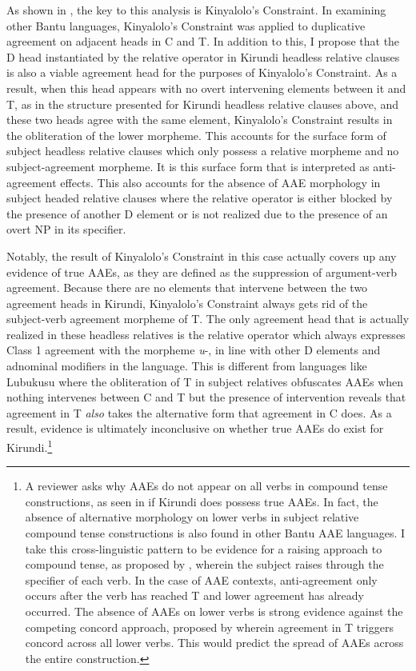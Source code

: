 \documentclass[output=paper,colorlinks,citecolor=brown
]{langscibook}
\begin{document}
As shown in , the key to this analysis is Kinyalolo's Constraint. In examining other Bantu languages, Kinyalolo's Constraint was applied to duplicative agreement on adjacent heads in C and T. In addition to this, I propose that the D head instantiated by the relative operator in Kirundi headless relative clauses is also a viable agreement head for the purposes of Kinyalolo's Constraint. As a result, when this head appears with no overt intervening elements between it and T, as in the structure presented for Kirundi headless relative clauses above, and these two heads agree with the same element, Kinyalolo's Constraint results in the obliteration of the lower morpheme. This accounts for the surface form of subject headless relative clauses which only possess a relative morpheme and no subject-agreement morpheme. It is this surface form that is interpreted as anti-agreement effects. This also accounts for the absence of AAE morphology in subject headed relative clauses where the relative operator is either blocked by the presence of another D element or is not realized due to the presence of an overt NP in its specifier.

Notably, the result of Kinyalolo's Constraint in this case actually covers up any evidence of true AAEs, as they are defined as the suppression of argument-verb agreement. Because there are no elements that intervene between the two agreement heads in Kirundi, Kinyalolo's Constraint always gets rid of the subject-verb agreement morpheme of T. The only agreement head that is actually realized in these headless relatives is the relative operator which always expresses Class 1 agreement with the morpheme \emph{u}-, in line with other D elements and adnominal modifiers in the language. This is different from languages like Lubukusu where the obliteration of T in subject relatives obfuscates AAEs when nothing intervenes between C and T but the presence of intervention reveals that agreement in T \emph{also} takes the alternative form that agreement in C does. As a result, evidence is ultimately inconclusive on whether true AAEs do exist for Kirundi.\footnote{A reviewer asks why AAEs do not appear on all verbs in compound tense constructions, as seen in  if Kirundi does possess true AAEs. In fact, the absence of alternative morphology on lower verbs in subject relative compound tense constructions is also found in other Bantu AAE languages. I take this cross-linguistic pattern to be evidence for a raising approach to compound tense, as proposed by \citet{Carstens:2008}, wherein the subject raises through the specifier of each verb. In the case of AAE contexts, anti-agreement only occurs after the verb has reached T and lower agreement has already occurred. The absence of AAEs on lower verbs is strong evidence against the competing concord approach, proposed by \citet{BHenderson:2011} wherein agreement in T triggers concord across all lower verbs. This would predict the spread of AAEs across the entire construction.}
\end{document}
